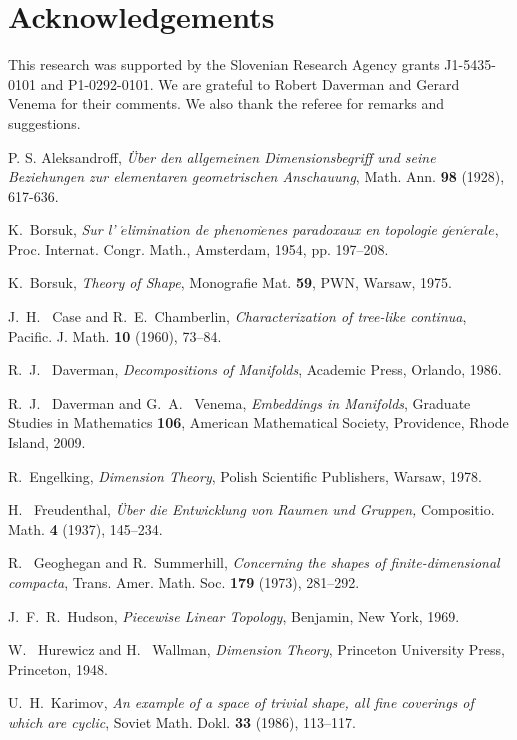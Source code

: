 \section{Acknowledgements}
This research was supported by the Slovenian Research Agency
grants J1-5435-0101 and P1-0292-0101. We are grateful to Robert Daverman and
Gerard Venema for their comments. We also thank the referee for remarks and suggestions.

\providecommand{\bysame}{\leavevmode\hbox to3em{\hrulefill}\thinspace}
\begin{thebibliography}{999}

P. S. Aleksandroff, \emph{ \"Uber den allgemeinen
Dimensionsbegriff und seine Beziehungen zur elementaren
geometrischen Anschauung},
Math. Ann. \textbf{98} (1928), 617-636.

K.~Borsuk, \emph{Sur l' $\acute{e}$limination de
phenom$\grave{e}$nes paradoxaux en topologie
$g\acute{e}n\acute{e}rale $}, Proc. Internat. Congr. Math.,
Amsterdam, 1954, pp. 197--208.

K.~Borsuk, \emph{Theory of Shape}, Monografie Mat. \textbf{59},
PWN, Warsaw, 1975.

J.~H.~ Case and R.~E.~Chamberlin, \emph{Characterization of
tree-like continua}, {Pacific. J. Math.} \textbf{10} (1960),
73--84.

R.~J.~ Daverman, \emph{Decompositions of Manifolds}, Academic
Press, Orlando, 1986.

R.~J.~ Daverman and G.~A.~ Venema, \emph{Embeddings in Manifolds},
Graduate Studies in Mathematics \textbf{106}, American
Mathematical Society, Providence, Rhode Island, 2009.

R.~Engelking, \emph{Dimension Theory}, Polish Scientific
Publishers, Warsaw, 1978.

H.~ Freudenthal, \emph{\"Uber die Entwicklung von Raumen
und Gruppen,} {Compositio. Math.} \textbf{4} (1937), 145--234.

R.~ Geoghegan and R.~Summerhill, \emph{Concerning the shapes of
finite-dimensional compacta}, {Trans. Amer. Math. Soc.}
\textbf{179} (1973), 281--292.

J.~F.~R.~Hudson, \emph{Piecewise Linear Topology}, Benjamin, New
York, 1969.

W.~ Hurewicz and H.~ Wallman, \emph{Dimension Theory}, Princeton
University Press, Princeton, 1948.

U.~H.~Karimov, \emph{An example of a space of trivial shape, all
fine coverings of which are cyclic}, {Soviet Math. Dokl.}
\textbf{33} (1986), 113--117.


\end{thebibliography}
